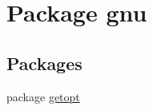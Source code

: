 \hypertarget{namespacegnu}{
\section{Package gnu}
\label{namespacegnu}
}
\subsection*{Packages}
\begin{DoxyCompactItemize}
\item 
package \hyperlink{namespacegnu_1_1getopt}{getopt}
\end{DoxyCompactItemize}
